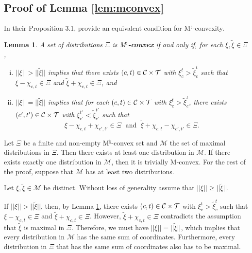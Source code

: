 \documentclass[12pt]{amsart}
\newtheorem{lemma}{Lemma}
\theoremstyle{remark}
\newcommand{\norm}[1]{|| #1 ||}
\begin{document}
\bigskip





\subsection*{Proof of Lemma \ref{lem:mconvex}}
In their Proposition 3.1, \cite{murotashioura2018} provide an equivalent condition for M$^{\natural}$-convexity.


\begin{lemma}\label{lem:natalt}
A set of distributions $\Xi$ is M$^{\natural}$\textbf{-convex} if and only if, for each $\xi,\tilde{\xi} \in \Xi$,
\begin{enumerate}[(i)]
\item $\norm{\xi}>\norm{\tilde \xi}$ implies that there exists $(c,t) \in \mathcal{C} \times \mathcal{T}$ with $\xi_c^t>\tilde{\xi}_c^t$ such that $\xi-\chi_{c,t} \in \Xi$ and $\tilde{\xi}+\chi_{c,t} \in \Xi$, and
\item $\norm{\xi}=\norm{\tilde \xi}$ implies that for each $(c,t) \in \mathcal{C} \times \mathcal{T}$ with $\xi_c^t>\tilde{\xi}_c^t$, there exists $(c',t') \in \mathcal{C} \times \mathcal{T}$ with  $\xi_{c'}^{t'}<\tilde{\xi}_{c'}^{t'}$ such that
\[\xi-\chi_{c,t}+\chi_{c',t'}\in \Xi \; \mbox{ and } \; \tilde{\xi}+\chi_{c,t}-\chi_{c',t'} \in \Xi.\]
\end{enumerate}
\end{lemma}


Let $\Xi$ be a finite and non-empty M$^{\natural}$-convex set and
$\mathcal{M}$ the set of maximal distributions in $\Xi$. Then
there exists at least one distribution in $\mathcal{M}$.
If there exists exactly one distribution in $\mathcal{M}$, then it is trivially M-convex.
For the rest of the proof, suppose that $\mathcal{M}$ has at least two distributions.

Let $\xi, \tilde \xi \in \mathcal{M}$ be distinct. Without loss of generality assume
that $\norm{\xi} \ge \norm{\tilde \xi}$.

If $\norm{\xi} > \norm{\tilde \xi}$, then, by Lemma \ref{lem:natalt}, there exists
$(c,t) \in \mathcal{C} \times \mathcal{T}$ with $\xi_c^t>\tilde{\xi}_c^t$ such that
$\xi-\chi_{c,t} \in \Xi$ and $\tilde{\xi}+\chi_{c,t} \in \Xi$. However, $\tilde{\xi}+\chi_{c,t} \in \Xi$ contradicts the assumption that $\tilde{\xi}$ is
maximal in $\Xi$. Therefore, we must have $\norm{\xi} = \norm{\tilde \xi}$, which
implies that every distribution in $\mathcal{M}$ has the same sum of coordinates.
Furthermore, every distribution in $\Xi$ that has the same sum of coordinates also has
to be maximal.
\end{document}
